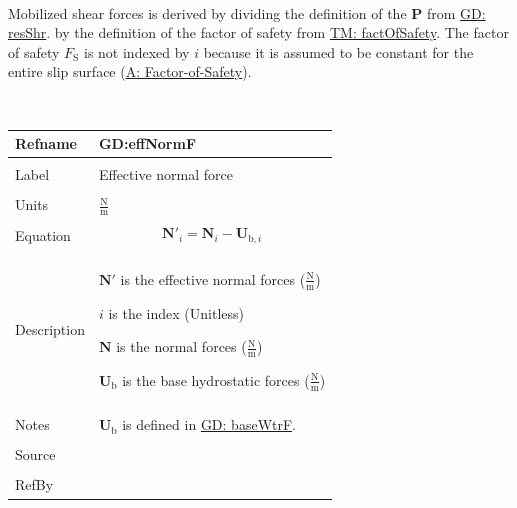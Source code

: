 \documentclass[12pt]{article}
\begin{document}
\paragraph{}
\label{GD:mobShrDeriv}
Mobilized shear forces is derived by dividing the definition of the $\mathbf{P}$ from \hyperref[GD:resShr]{GD: resShr}. by the definition of the factor of safety from \hyperref[TM:factOfSafety]{TM: factOfSafety}. The factor of safety ${F_{\text{S}}}$ is not indexed by $i$ because it is assumed to be constant for the entire slip surface (\hyperref[assumpFOS]{A: Factor-of-Safety}).
\par~

\noindent \begin{minipage}{\textwidth}
\begin{tabular}{>{\raggedright}p{}>{\raggedright\arraybackslash}p{}}
\toprule \textbf{Refname} & \textbf{GD:effNormF}
\label{GD:effNormF}
\\ \midrule \\
Label & Effective normal force
\\ \midrule \\
Units & $\frac{\text{N}}{\text{m}}$
\\ \midrule \\
Equation & \begin{displaymath}
           {\mathbf{N'}}_{i}={\mathbf{N}}_{i}-{\mathbf{U}_{\text{b},i}}
           \end{displaymath}
\\ \midrule \\
Description & \begin{symbDescription}
              \item{$\mathbf{N'}$ is the effective normal forces ($\frac{\text{N}}{\text{m}}$)}
              \item{$i$ is the index (Unitless)}
              \item{$\mathbf{N}$ is the normal forces ($\frac{\text{N}}{\text{m}}$)}
              \item{${\mathbf{U}_{\text{b}}}$ is the base hydrostatic forces ($\frac{\text{N}}{\text{m}}$)}
              \end{symbDescription}
\\ \midrule \\
Notes & ${\mathbf{U}_{\text{b}}}$ is defined in \hyperref[GD:baseWtrF]{GD: baseWtrF}.
\\ \midrule \\
Source & \cite{chen2005}
\\ \midrule \\
RefBy & 
\\ \bottomrule
\end{tabular}
\end{minipage}
\end{document}
